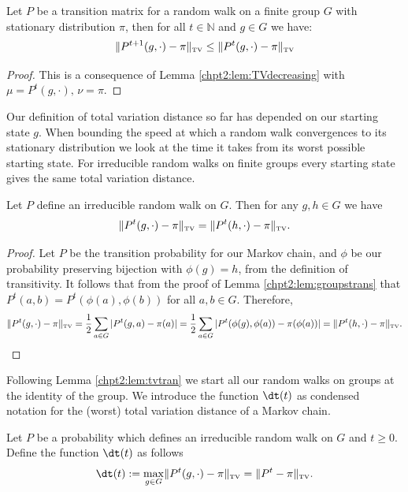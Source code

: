 \documentclass[11pt]{report}
\begin{document}
\begin{corollary}
	Let $P$ be a transition matrix for a random walk on a finite group $G$ with stationary distribution $\pi$, then for all $t\in\mathbb{N}$ and $g\in G$ we have:
	\[\lVert P^{t+1}(g,\cdot) - \pi \rVert_{\textnormal{\tiny TV}} \leq \lVert 
	P^{t}(g,\cdot) - 
	\pi \rVert_{\textnormal{\tiny TV}}\]
\end{corollary}

\begin{proof}
	This is a consequence of Lemma \ref{chpt2:lem:TVdecreasing} with $\mu= 
	P^{t}(g,\cdot),\, \nu =\pi$. 
\end{proof}


Our definition of total variation distance so far has depended on our starting 
state $g$. When bounding the speed at which a random walk convergences to its stationary distribution we look at the time it takes from its worst possible starting state. For irreducible random walks on finite groups every starting state gives the same total variation distance.




\begin{lemma}
	\label{chpt2:lem:tvtran}
	Let $P$ define an irreducible random walk on $G$. Then 
	for any $g,h\in  G$ we have 
	\[\lVert P^{t}(g,\cdot) - \pi \rVert_{\textnormal{\tiny TV}} = \lVert P^{t}(h,\cdot) 
	- \pi \rVert_{\textnormal{\tiny TV}}.\]
\end{lemma}

\begin{proof}
	Let $P$ be the transition probability for our Markov chain, and $\phi$ be our probability preserving bijection with  $\phi(g) = h$, from the definition of transitivity. It 
	follows that from the 
	proof of Lemma \ref{chpt2:lem:groupstrans} that $P^{t}(a,b) 
	= P^{t}(\phi(a),\phi(b))$ for all $a,b \in G$. Therefore,
	\[\lVert P^{t}(g,\cdot) - \pi \rVert_{\textnormal{\tiny TV}} = 
	\frac{1}{2}\sum_{a\in G}|P^{t}(g,a) - \pi(a) | = \frac{1}{2}\sum_{a\in 
		G}|P^{t}(\phi(g),\phi(a)) - \pi(\phi(a)) | =\lVert P^{t}(h,\cdot) - \pi 
	\rVert_{\textnormal{\tiny TV}}. \qedhere\]
\end{proof}

Following Lemma \ref{chpt2:lem:tvtran} we start all our random walks on 
groups at the identity of the group. We introduce the function $\dt(t)$ as 
condensed notation for the (worst) total variation distance of a Markov chain.
\begin{defn}
	\label{chpt2:def:dt}
	Let $P$ be a probability which defines an irreducible random walk on $G$ 
	and $t\geq 0$. Define the function $\dt(t)$  as follows
	\[\dt(t) := \max_{g\in G} \lVert P^{t}(g,\cdot) - 
	\pi \rVert_{\textnormal{\tiny TV}} = \lVert P^{t} - \pi 
	\rVert_{\textnormal{\tiny TV}}.\]
\end{defn}
\end{document}
